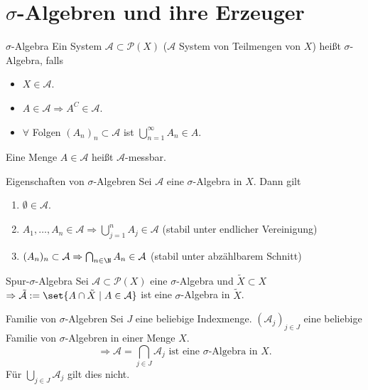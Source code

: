 \section*{\(\sigma\)-Algebren und ihre Erzeuger}

\begin{karte}{\(\sigma\)-Algebra}
	Ein System \(\mathcal{A} \subset \mathcal{P}(X)\) (\(\mathcal{A}\) System von Teilmengen von \(X\)) 
	heißt \(\sigma\)-Algebra, falls 
	\begin{itemize}
		\item \( X \in \mathcal{A} \).
		\item \( A \in \mathcal{A} \Rightarrow A^C \in \mathcal{A} \).
		\item \(\forall\) Folgen \( (A_n)_n \subset \mathcal{A} \) ist 
		\( \bigcup_{n=1}^\infty A_n \in A \). 
	\end{itemize}
	Eine Menge \(A \in \mathcal{A}\) heißt \(\mathcal{A}\)-messbar.
\end{karte}

\begin{karte}{Eigenschaften von \(\sigma\)-Algebren}
	Sei \(\mathcal{A}\) eine \(\sigma\)-Algebra in \(X\). Dann gilt 
	\begin{enumerate}
		\item \(\emptyset \in \mathcal{A}\).
		\item \( A_1, \ldots, A_n \in \mathcal{A}\Rightarrow \bigcup_{j=1}^n A_j \in \mathcal{A} \) (stabil unter endlicher Vereinigung)
		\item \( (A_n)_n \subset \mathcal{A} \Rightarrow \bigcap_{n\in\N} A_n \in \mathcal{A} \) (stabil unter abzählbarem Schnitt)
	\end{enumerate}
\end{karte}

\begin{karte}{Spur-\(\sigma\)-Algebra}
	Sei \(\mathcal{A} \subset \mathcal{P}(X)\) eine \(\sigma\)-Algebra und \(\tilde{X} \subset X\) 
	\( \Rightarrow \tilde{\mathcal{A}} := \set{ A \cap \tilde{X} \;\vert\; A \in \mathcal{A} } \) ist eine 
	\(\sigma\)-Algebra in \(\tilde{X}\).
\end{karte}

\begin{karte}{Familie von \(\sigma\)-Algebren}
	Sei \(J\) eine beliebige Indexmenge. 
	\((\mathcal{A}_j)_{j\in J}\) eine beliebige Familie von 
	\(\sigma\)-Algebren in einer Menge \(X\).
	\[ \Rightarrow \mathcal{A} = \bigcap_{j\in J} \mathcal{A}_j \text{ ist eine \(\sigma\)-Algebra in } X. \]
	Für \( \bigcup_{j\in J}\mathcal{A}_j  \) gilt dies nicht.
\end{karte}

